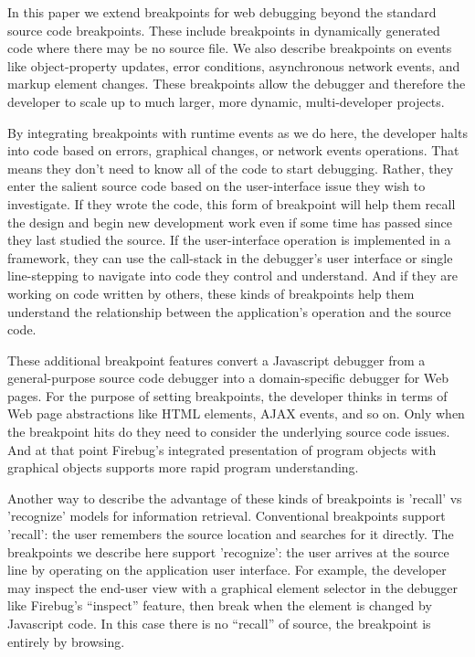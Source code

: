 \documentclass{www2010-accepted}
\begin{document}
In this paper we extend breakpoints for
web debugging beyond the standard source code breakpoints. These
include breakpoints in dynamically generated code where there may be
no source file. We also describe
 breakpoints on events like object-property updates,
  error conditions, asynchronous
network events, and markup
element changes. These breakpoints allow the debugger and therefore
the developer to scale up to much larger, more dynamic,
multi-developer projects.

By integrating breakpoints with runtime events as we do here, the
developer halts into code based on errors, graphical changes, or
network events operations. That means they don't need to know all of
the code to start debugging. Rather, they enter the salient source
code based on the user-interface issue they wish to investigate. If
they wrote the code, this form of breakpoint will help them recall the
design and begin new development work even if some time has passed
since they last studied the source. If the user-interface operation is
implemented in a framework, they can use the call-stack in the
debugger's user interface or single line-stepping to navigate into
code they control and understand. And if they are working on code
written by others, these kinds of breakpoints help them understand the
relationship between the application's operation and the source code.

These additional breakpoint features convert a Javascript
debugger from a general-purpose source code debugger into a
domain-specific debugger for Web pages. For the purpose of
setting breakpoints, the developer thinks in terms of Web page
abstractions like HTML elements, AJAX events, and so on.  Only when
the breakpoint hits do they need to consider the underlying source
code issues. And at that point Firebug's integrated presentation of
program objects with graphical objects supports more rapid program
understanding.

Another way to describe the advantage of these kinds of breakpoints is
'recall' vs 'recognize' models for information retrieval. Conventional
breakpoints support 'recall': the user remembers the source location
and searches for it directly. The breakpoints we describe here support
'recognize': the user arrives at the source line by operating on the
application user interface. For example, the developer may inspect the
end-user view with a graphical element selector in the debugger like
Firebug's ``inspect'' feature, then break when the element is changed by
Javascript code.  In this case there is no ``recall'' of source, the
breakpoint is entirely by browsing.
\end{document}
